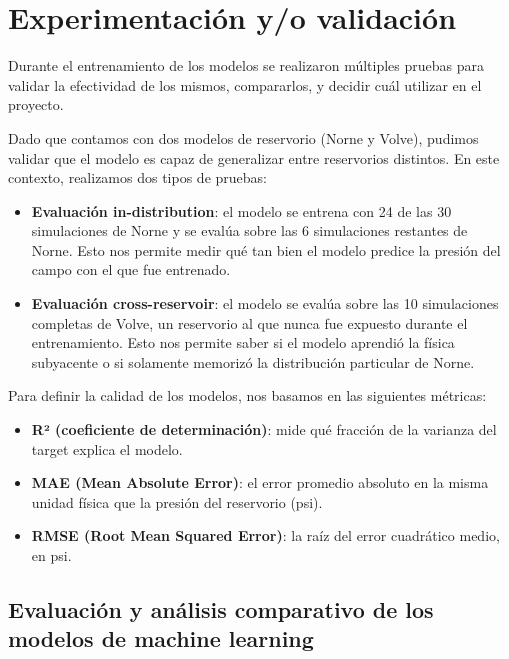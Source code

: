 \documentclass[12pt,a4paper]{article}
\begin{document}
\newpage
\section{Experimentación y/o validación}
\label{sec:experimentacion}

Durante el entrenamiento de los modelos se realizaron múltiples pruebas para validar la efectividad de los mismos,
compararlos, y decidir cuál utilizar en el proyecto.

Dado que contamos con dos modelos de reservorio (Norne y Volve), pudimos validar
que el modelo es capaz de generalizar entre reservorios distintos. En este contexto, realizamos
dos tipos de pruebas:

\begin{itemize}
  \item \textbf{Evaluación in-distribution}: el modelo se entrena con 24 de las 30 simulaciones
  de Norne y se evalúa sobre las 6 simulaciones restantes de Norne. Esto nos permite medir qué
  tan bien el modelo predice la presión del campo con el que fue entrenado.

  \item \textbf{Evaluación cross-reservoir}: el modelo se evalúa sobre las 10 simulaciones
  completas de Volve, un reservorio al que nunca fue expuesto durante el entrenamiento. Esto nos
  permite saber si el modelo aprendió la física subyacente o si solamente memorizó la distribución particular de Norne.
\end{itemize}

Para definir la calidad de los modelos, nos basamos en las siguientes métricas:
\begin{itemize}
  \item \textbf{R² (coeficiente de determinación)}: mide qué fracción de la varianza del target explica el modelo.
  \item \textbf{MAE (Mean Absolute Error)}: el error promedio absoluto en la misma unidad física que la presión del reservorio (psi).
  \item \textbf{RMSE (Root Mean Squared Error)}: la raíz del error cuadrático medio, en psi.
\end{itemize}

\subsection{Evaluación y análisis comparativo de los modelos de machine learning}
\end{document}
